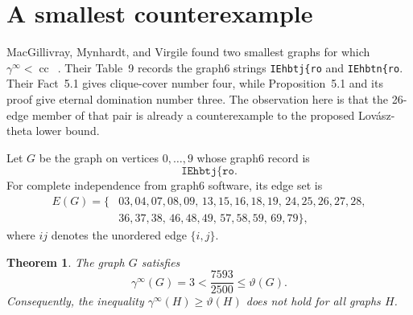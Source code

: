 \documentclass[11pt]{article}
\newtheorem{theorem}{Theorem}
\newcommand{\cc}{\operatorname{cc}}
\begin{document}
\section{A smallest counterexample}

MacGillivray, Mynhardt, and Virgile found two smallest graphs for which
\(\gamma^\infty<\cc\)~\cite{mmv}.  Their Table~9 records the graph6 strings
\texttt{IEhbtj\{ro} and \texttt{IEhbtn\{ro}.  Their Fact~5.1 gives
clique-cover number four, while Proposition~5.1 and its proof give eternal
domination number three.  The observation here is that the 26-edge member of
that pair is already a counterexample to the proposed Lov\'asz-theta lower
bound.

Let \(G\) be the graph on vertices \(0,\ldots,9\) whose graph6 record is
\[
 \texttt{IEhbtj\{ro}.
\]
For complete independence from graph6 software, its edge set is
\begin{align*}
E(G)=\{&
03,04,07,08,09,\,
13,15,16,18,19,\,
24,25,26,27,28,\\
&36,37,38,\,
46,48,49,\,
57,58,59,\,
69,79\},
\end{align*}
where \(ij\) denotes the unordered edge \(\{i,j\}\).

\begin{theorem}\label{thm:counterexample}
The graph \(G\) satisfies
\[
 \gamma^\infty(G)=3
 <\frac{7593}{2500}
 \leq\vartheta(G).
\]
Consequently, the inequality
\(\gamma^\infty(H)\geq\vartheta(H)\) does not hold for all graphs \(H\).
\end{theorem}
\end{document}
